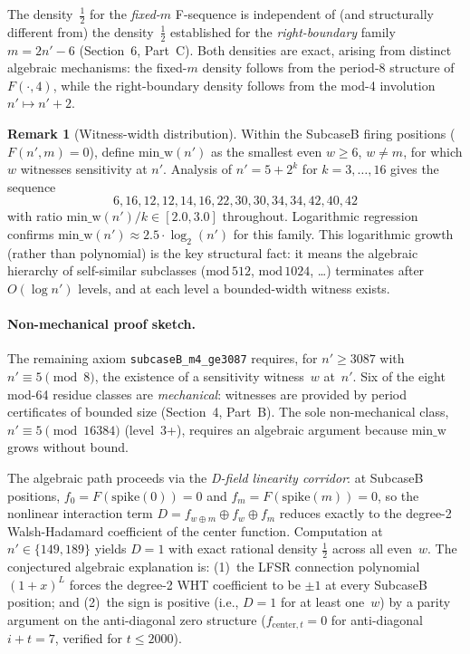 \documentclass[11pt]{article}
\theoremstyle{plain}
\theoremstyle{definition}
\newtheorem{remark}[theorem]{Remark}
\begin{document}
The density~$\frac{1}{2}$ for the \emph{fixed-$m$} F-sequence is independent of
(and structurally different from) the density~$\frac{1}{2}$ established for the
\emph{right-boundary} family $m = 2n'-6$ (Section~6, Part~C).  Both densities are
exact, arising from distinct algebraic mechanisms: the fixed-$m$ density follows
from the period-8 structure of $F(\cdot, 4)$, while the right-boundary density
follows from the mod-4 involution $n' \mapsto n'+2$.

\begin{remark}[Witness-width distribution]
\label{rem:minw}
Within the SubcaseB firing positions ($F(n', m) = 0$), define
$\mathrm{min\_w}(n')$ as the smallest even $w \geq 6$, $w \neq m$, for which $w$
witnesses sensitivity at $n'$.  Analysis of $n' = 5 + 2^k$ for $k = 3,\ldots,16$
gives the sequence
\[
  6, 16, 12, 12, 14, 16, 22, 30, 30, 34, 34, 42, 40, 42
\]
with ratio $\mathrm{min\_w}(n')/k \in [2.0, 3.0]$ throughout.  Logarithmic regression
confirms $\mathrm{min\_w}(n') \approx 2.5 \cdot \log_2(n')$ for this family.
This logarithmic growth (rather than polynomial) is the key structural fact:
it means the algebraic hierarchy of self-similar subclasses ($\mathrm{mod}\,512$,
$\mathrm{mod}\,1024$, \ldots) terminates after $O(\log n')$ levels, and at
each level a bounded-width witness exists.
\end{remark}

\paragraph{Non-mechanical proof sketch.}
The remaining axiom \texttt{subcaseB\_m4\_ge3087} requires, for $n' \geq 3087$ with
$n' \equiv 5 \pmod{8}$, the existence of a sensitivity witness~$w$ at~$n'$.
Six of the eight mod-64 residue classes are \emph{mechanical}: witnesses are
provided by period certificates of bounded size (Section~4, Part~B).  The
sole non-mechanical class, $n' \equiv 5 \pmod{16384}$ (level~3+), requires
an algebraic argument because $\mathrm{min\_w}$ grows without bound.

The algebraic path proceeds via the \emph{D-field linearity corridor}: at
SubcaseB positions, $f_0 = F(\mathrm{spike}(0)) = 0$ and $f_m = F(\mathrm{spike}(m)) = 0$,
so the nonlinear interaction term $D = f_{w \oplus m} \oplus f_w \oplus f_m$
reduces exactly to the degree-2 Walsh-Hadamard coefficient of the center function.
Computation at $n' \in \{149, 189\}$ yields $D = 1$ with exact rational density $\frac{1}{2}$
across all even~$w$.  The conjectured algebraic explanation is:
(1)~the LFSR connection polynomial $(1+x)^L$ forces the degree-2 WHT coefficient
to be $\pm 1$ at every SubcaseB position; and
(2)~the sign is positive (i.e., $D = 1$ for at least one~$w$) by a parity argument
on the anti-diagonal zero structure ($f_{\mathrm{center},t} = 0$ for anti-diagonal
$i + t = 7$, verified for $t \leq 2000$).
\end{document}
